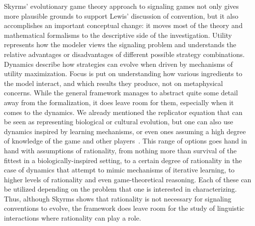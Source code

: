 \documentclass[a4paper]{article}
\begin{document}
Skyrms' evolutionary game theory approach to signaling games not only gives more plausible grounds to support Lewis' discussion of convention, but it also accomplishes an important conceptual change: it moves most of the theory and mathematical formalisms to the descriptive side of the investigation.
Utility represents how the modeler views the signaling problem and understands the relative advantages or disadvantages of different possible strategy combinations.
Dynamics describe how strategies can evolve when driven by mechanisms of utility maximization.
Focus is put on understanding how various ingredients to the model interact, and which results they produce, not on metaphysical concerns.
While the general framework manages to abstract quite some detail away from the formalization, it does leave room for them, especially when it comes to the dynamics.
We already mentioned the replicator equation that can be seen as representing biological or cultural evolution, but one can also use dynamics inspired by learning mechanisms, or even ones assuming a high degree of knowledge of the game and other players~\parencite[\emph{e.g.}][]{Muhlenbernd2011:Learning-with-N,SpikeStadler2016:Minimal-Require}.
This range of options goes hand in hand with assumptions of rationality, from nothing more than survival of the fittest in a biologically-inspired setting, to a certain degree of rationality in the case of dynamics that attempt to mimic mechanisms of iterative learning, to higher levels of rationality and even game-theoretical reasoning.
Each of these can be utilized depending on the problem that one is interested in characterizing.
Thus, although Skyrms shows that rationality is not necessary for signaling conventions to evolve, the framework does leave room for the study of linguistic interactions where rationality can play a role.
\end{document}
